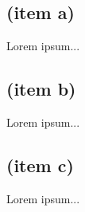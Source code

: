 \subsection{(item a)}
Lorem ipsum...

\subsection{(item b)}
Lorem ipsum...

\subsection{(item c)}
Lorem ipsum...